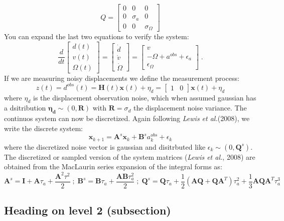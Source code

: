 \documentclass[paper=a4, fontsize=11pt]{scrartcl} %
\numberwithin{equation}{section} %
\numberwithin{figure}{section} %
\numberwithin{table}{section} %
\begin{document}
$$
Q=\left[\begin{matrix}
 0 & 0 & 0 \\
 0 & \sigma_a & 0 \\
 0 & 0 & \sigma_\Omega
\end{matrix}\right]
$$
You can expand the last two equations to verify the system:
$$
\frac{d}{dt}
\left[\begin{matrix}
  d(t) \\
  v(t) \\
  \Omega(t)
\end{matrix}\right]=
\left[\begin{matrix}
  \dot{d} \\
  \dot{v} \\
  \dot{\Omega}
\end{matrix}\right]=
\left[\begin{matrix}
  v\\
  -\Omega+a^{obs}+\epsilon_a \\
  \epsilon_\Omega
\end{matrix}\right]\;.
$$
If we are measuring noisy displacements we define the measurement process:
$$
z(t)=d^{obs}(t)=\mathbf{H}(t)\mathbf{x}(t)+\eta_d=
\left[\begin{matrix}
 1 & 0
\end{matrix}\right]\mathbf{x}(t)+\eta_d
$$
where $\eta_d$ is the displacement observation noise, which when assumed gaussian has a dsitribution $\mathbf{\eta_d}\sim(0,\mathbf{R})$ with $\mathbf{R}=\sigma_d$ the displacement noise variance. The continuos system can now be discretized. Again following \textit{Lewis et al.}(2008), we write the discrete system:
$$
\mathbf{x}_{k+1}=\mathbf{A}^s\mathbf{x}_k+\mathbf{B}^sa^{obs}_k+\epsilon_k
$$
where the discretized noise vector is gaussian and disitrbuted like $\epsilon_k\sim(0,\mathbf{Q}^s)$. The discretized or sampled version of the system matrices (\textit{Lewis et al.}, 2008) are obtained from the MacLaurin series expansion of the integral forms as:
$$
\mathbf{A}^s=\mathbf{I}+\mathbf{A}\tau_a+\frac{\mathbf{A}^2\tau^2}{2} \;;\;
\mathbf{B}^s=\mathbf{B}\tau_a+\frac{\mathbf{A}\mathbf{B}\tau_a^2}{2} \;;\;
\mathbf{Q}^s=\mathbf{Q}\tau_a+\frac{1}{2}(\mathbf{AQ}+\mathbf{QA}^T)\tau_a^2+\frac{1}{3}\mathbf{AQA}^T\tau^3_a
$$
\subsection{Heading on level 2 (subsection)}



\end{document}
